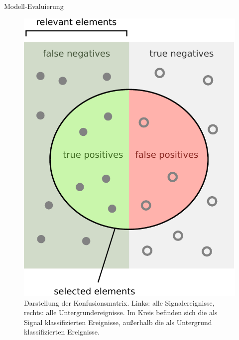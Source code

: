 \documentclass[t]{beamer}
\begin{document}
\begin{columns}[onlytextwidth]
\begin{column}{0.5\textwidth}
      \begin{block}{Modell-Evaluierung}
        \begin{multicols}{2}
          \begin{figure}
            \centering
            \includegraphics[width=0.9\linewidth]{images/precisionrecall-crop.pdf}
            \caption{Darstellung der Konfusionsmatrix. Links: alle Signalereignisse,
            rechts: alle Untergrundereignisse. Im Kreis befinden sich die als Signal klassifizierten Ereignisse, außerhalb die als Untergrund klassifizierten Ereignisse.}
          \end{figure}        
          \columnbreak


\end{multicols}
\end{block}
\end{column}
\end{columns}
\end{document}

